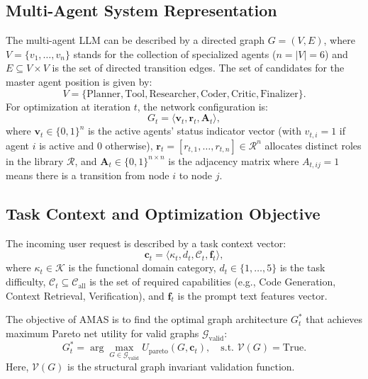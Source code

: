 ﻿\documentclass[conference]{IEEEtran}
\begin{document}
\subsection{Multi-Agent System Representation}
The multi-agent LLM can be described by a directed graph $G = (V, E)$, where $V = \{v_1, \dots, v_n\}$ stands for the collection of specialized agents ($n = |V| = 6$) and $E \subseteq V \times V$ is the set of directed transition edges. The set of candidates for the master agent position is given by:
\begin{equation}
V = \{\text{Planner}, \text{Tool}, \text{Researcher}, \text{Coder}, \text{Critic}, \text{Finalizer}\}.
\end{equation}
For optimization at iteration $t$, the network configuration is:
\begin{equation}
G_t = \langle \mathbf{v}_t, \mathbf{r}_t, \mathbf{A}_t \rangle,
\end{equation}
where $\mathbf{v}_t \in \{0, 1\}^n$ is the active agents' status indicator vector (with $v_{t,i} = 1$ if agent $i$ is active and 0 otherwise), $\mathbf{r}_t = [r_{t,1}, \dots, r_{t,n}] \in \mathcal{R}^n$ allocates distinct roles in the library $\mathcal{R}$, and $\mathbf{A}_t \in \{0, 1\}^{n \times n}$ is the adjacency matrix where $A_{t,ij} = 1$ means there is a transition from node $i$ to node $j$.

\subsection{Task Context and Optimization Objective}
The incoming user request is described by a task context vector:
\begin{equation}
\mathbf{c}_t = \langle \kappa_t, d_t, \mathcal{C}_t, \mathbf{f}_t \rangle,
\label{eq:context}
\end{equation}
where $\kappa_t \in \mathcal{K}$ is the functional domain category, $d_t \in \{1, \dots, 5\}$ is the task difficulty, $\mathcal{C}_t \subseteq \mathcal{C}_{\mathrm{all}}$ is the set of required capabilities (e.g., Code Generation, Context Retrieval, Verification), and $\mathbf{f}_t$ is the prompt text features vector.

The objective of AMAS is to find the optimal graph architecture $G_t^*$ that achieves maximum Pareto net utility for valid graphs $\mathcal{G}_{\mathrm{valid}}$:
\begin{equation}
G_t^* = \arg\max_{G \in \mathcal{G}_{\mathrm{valid}}} U_{\mathrm{pareto}}(G, \mathbf{c}_t), \quad \text{s.t. } \mathcal{V}(G) = \text{True}.
\label{eq:optimization}
\end{equation}
Here, $\mathcal{V}(G)$ is the structural graph invariant validation function.
\end{document}

